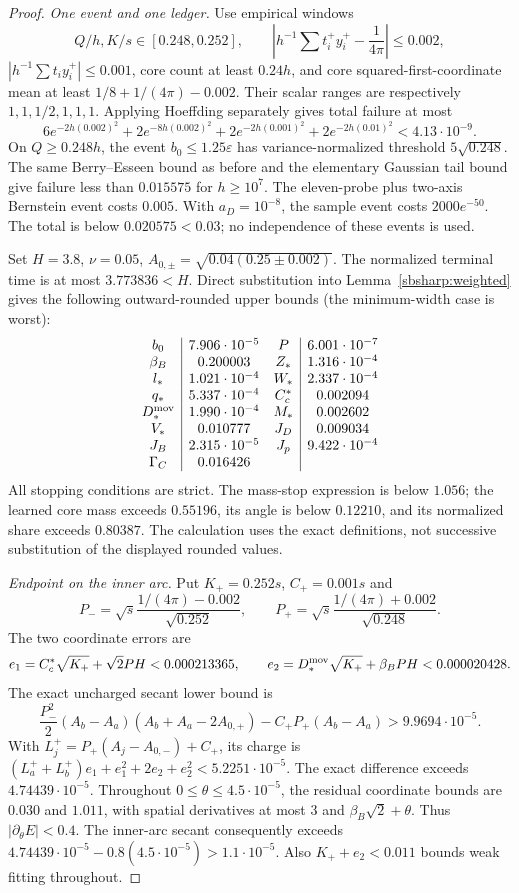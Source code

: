 \documentclass{article} %
\theoremstyle{plain}
\theoremstyle{definition}
\theoremstyle{remark}
\begin{document}
\begin{proof}
\emph{One event and one ledger.}
Use empirical windows
\[
 Q/h,K/s\in[0.248,0.252],\qquad
 \left|h^{-1}\sum t_i^+y_i^+-\frac1{4\pi}\right|\le0.002,
\]
$|h^{-1}\sum t_i y_i^+|\le0.001$, core count at least $0.24h$,
and core squared-first-coordinate mean at least
$1/8+1/(4\pi)-0.002$. Their scalar ranges are respectively
$1,1,1/2,1,1,1$. Applying Hoeffding separately gives total failure at most
\[
 6e^{-2h(0.002)^2}+2e^{-8h(0.002)^2}
             +2e^{-2h(0.001)^2}+2e^{-2h(0.01)^2}<4.13\cdot10^{-9}.
\]
On $Q\ge0.248h$, the event $b_0\le1.25\varepsilon$ has
variance-normalized threshold $5\sqrt{0.248}$. The same
Berry--Esseen bound as before and the elementary Gaussian tail bound
give failure less than $0.015575$ for $h\ge10^7$.
The eleven-probe plus two-axis Bernstein event costs $0.005$.
With $a_D=10^{-8}$, the sample event costs $2000e^{-50}$.
The total is below $0.020575<0.03$; no independence of these events is
used.

Set $H=3.8$, $\nu=0.05$, $A_{0,\pm}=\sqrt{0.04(0.25\pm0.002)}$.
The normalized terminal time is at most $3.773836<H$. Direct
substitution into Lemma~\ref{sbsharp:weighted} gives the following
outward-rounded upper bounds (the minimum-width case is worst):
\[
\begin{array}{c|c@{\quad}c|c}
 b_0&7.906\cdot10^{-5}&P&6.001\cdot10^{-7}\\
 \beta_B&0.200003&Z_*&1.316\cdot10^{-4}\\
 l_*&1.021\cdot10^{-4}&W_*&2.337\cdot10^{-4}\\
 q_*&5.337\cdot10^{-4}&C_c^*&0.002094\\
 D_*^{\rm mov}&1.990\cdot10^{-4}&M_*&0.002602\\
 V_*&0.010777&J_D&0.009034\\
 J_B&2.315\cdot10^{-5}&J_p&9.422\cdot10^{-4}\\
 \Gamma_C&0.016426&&
\end{array}
\]
All stopping conditions are strict. The mass-stop expression is below
$1.056$; the learned core mass exceeds $0.55196$, its angle is below
$0.12210$, and its normalized share exceeds $0.80387$.
The calculation uses the exact definitions, not successive substitution
of the displayed rounded values.

\emph{Endpoint on the inner arc.}
Put $K_+=0.252s$, $C_+=0.001s$ and
\[
 P_-=\sqrt{s}\frac{1/(4\pi)-0.002}{\sqrt{0.252}},\qquad
 P_+=\sqrt{s}\frac{1/(4\pi)+0.002}{\sqrt{0.248}}.
\]
The two coordinate errors are
\[
 e_1=C_c^*\sqrt{K_+}+\sqrt2PH<0.000213365,\qquad
 e_2=D_*^{\rm mov}\sqrt{K_+}+\beta_BPH<0.000020428.
\]
The exact uncharged secant lower bound is
\[
 \frac{P_-^2}{2}(A_b-A_a)(A_b+A_a-2A_{0,+})
       -C_+P_+(A_b-A_a)>9.9694\cdot10^{-5}.
\]
With $L_j^+=P_+(A_j-A_{0,-})+C_+$, its charge is
$(L_a^++L_b^+)e_1+e_1^2+2e_2+e_2^2<5.2251\cdot10^{-5}$.
The exact difference exceeds $4.74439\cdot10^{-5}$.
Throughout $0\le\theta\le4.5\cdot10^{-5}$, the residual coordinate
bounds are $0.030$ and $1.011$, with spatial derivatives at most
$3$ and $\beta_B\sqrt2+\theta$. Thus $|\partial_\theta E|<0.4$.
The inner-arc secant consequently exceeds
$4.74439\cdot10^{-5}-0.8(4.5\cdot10^{-5})>1.1\cdot10^{-5}$.
Also $K_++e_2<0.011$ bounds weak fitting throughout.


\end{proof}
\end{document}
